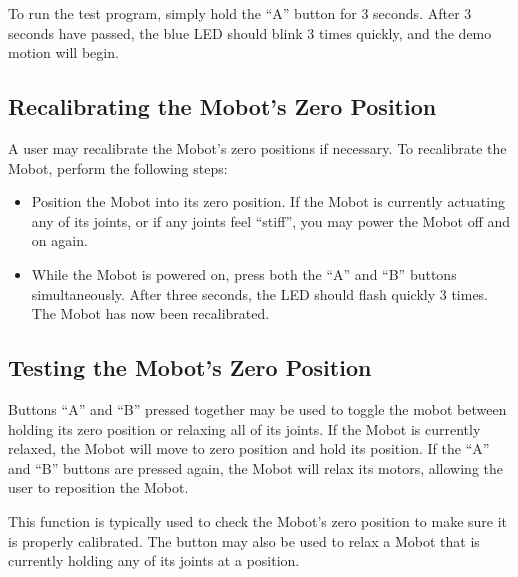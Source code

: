 \documentclass{article}
\begin{document}
To run the test program, simply hold the ``A'' button for 3 seconds. After
3 seconds have passed, the blue LED should blink 3 times quickly, and the
demo motion will begin.

\subsection{Recalibrating the Mobot's Zero Position}
A user may recalibrate the Mobot's zero positions if necessary. To recalibrate
the Mobot, perform the following steps:
\begin{itemize}
\item Position the Mobot into its zero position. If the Mobot is currently
actuating any of its joints, or if any joints feel ``stiff'', you may power the
Mobot off and on again.
\item While the Mobot is powered on, press both the ``A'' and ``B'' buttons
simultaneously. After three seconds, the LED should flash quickly 3 times. The Mobot has now
been recalibrated.
\end{itemize}

\subsection{\label{sec:zeroposition}Testing the Mobot's Zero Position}
Buttons ``A'' and ``B'' pressed together may be used to toggle the mobot between holding its zero position 
or relaxing all of its joints.  If the Mobot is currently relaxed,
the Mobot will move to zero position and hold its position. If the ``A'' and ``B'' buttons are pressed again, the 
Mobot will relax its motors, allowing the user to reposition the Mobot.

This function is typically used to check the Mobot's zero position to make sure
it is properly calibrated. The button may also be used to relax a Mobot that
is currently holding any of its joints at a position.
\end{document}
